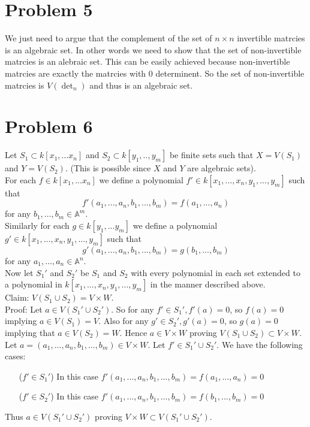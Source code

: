 \documentclass[12pt]{article}
\begin{document}
\section*{Problem 5}
We just need to argue that the complement of the set of $n \times n$ invertible matrcies is an algebraic set. In other words we need to show that the set of non-invertible matrcies is an alebraic set. This can be easily achieved because non-invertible matrcies are exactly the matrcies with 0 determinent. So the set of non-invertible matrcies is $V(\det_n)$ and thus is an algebraic set.
\section*{Problem 6}
Let $S_1 \subset k[x_1,...x_n]$ and $S_2 \subset k[y_1,..,y_m]$ be finite sets such that $X=V(S_1)$ and $Y=V(S_2)$. (This is possible since $X$ and $Y$ are algebraic sets). \\
For each $f \in k[x_1,...x_n]$ we define a polynomial
$f' \in k[x_1,...,x_n,y_1,...,y_m]$ such that
$$f'(a_1,...,a_n,b_1,...,b_m)=f(a_1,...,a_n)$$ for any 
$b_1,...,b_m \in \mathbb{A}^m$. \\
Similarly 
for each $g \in k[y_1,...y_m]$ we define a polynomial
$g' \in k[x_1,...,x_n,y_1,...,y_m]$ such that
$$g'(a_1,...,a_n,b_1,...,b_m)=g(b_1,...,b_m)$$ for any 
$a_1,...,a_n \in \mathbb{A}^n$. \\
Now let $S_1'$ and $S_2'$ be $S_1$ and $S_2$ with every polynomial in each set extended to a polynomial in $k[x_1,...,x_n,y_1,...,y_m]$ in the manner described above. \\
Claim: $V(S_1 \cup S_2)=V \times W$. \\
Proof: Let $a \in V(S_1' \cup S_2')$. So for any $f' \in S_1', f'(a)=0$, so $f(a)=0$ implying $a \in V(S_1)=V$.
Also for any $g' \in S_2', g'(a)=0$, so $g(a)=0$ implying that $a \in V(S_2)=W$. Hence $a \in V \times W$ proving
$V(S_1 \cup S_2) \subset V \times W$. \\
Let $a=(a_1,...,a_n,b_1,...,b_m) \in V \times W$. Let
$f' \in S_1' \cup S_2'$. We have the following cases:
\begin{enumerate}
\item[($f' \in S_1'$)] 
In this case $f'(a_1,...,a_n,b_1,...,b_m)=f(a_1,...,a_n)=0$
\item[($f' \in S_2'$)] 
In this case $f'(a_1,...,a_n,b_1,...,b_m)=f(b_1,...,b_m)=0$
\end{enumerate}
Thus $a \in V(S_1' \cup S_2')$ proving $
V \times W \subset V(S_1' \cup S_2')$.
 
\end{document}
